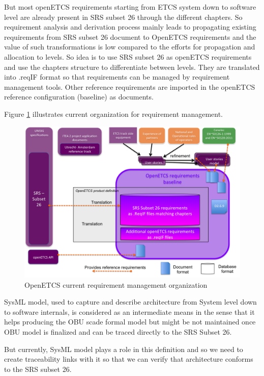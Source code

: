 \documentclass[11pt]{template/openetcs_report}
\begin{document}
But most openETCS requirements starting from ETCS system down to software level are already present in SRS subset 26 through the different chapters. So requirement analysis and derivation process mainly leads to propagating existing requirements from SRS subset 26 document to OpenETCS requirements and the value of such transformations is low compared to the efforts for propagation and allocation to levels. So idea is to use SRS subset 26 as openETCS requirements and use the chapters structure to differentiate between levels. They are translated into .reqIF format so that requirements can be managed by requirement management tools. Other reference requirements are imported in the openETCS reference configuration (baseline) as documents.

Figure \ref{fig:CurrentRequirementOrganization} illustrates current organization for requirement management.

\begin{figure}[htbp]
\centering
\includegraphics[width=1\linewidth]{./images/CurrentRequirementOrganization.png}
\caption{OpenETCS current requirement management organization}
\label{fig:CurrentRequirementOrganization}
\end{figure}

SysML model, used to capture and describe architecture from System level down to software internals, is considered as an intermediate means in the sense that it helps producing the OBU scade formal model but might be not maintained once OBU model is finalized and can be traced directly to the SRS Subset 26. 

But currently, SysML model plays a role in this definition and so we need to create traceability links with it so that we can verify that architecture conforms to the SRS subset 26.
\end{document}
